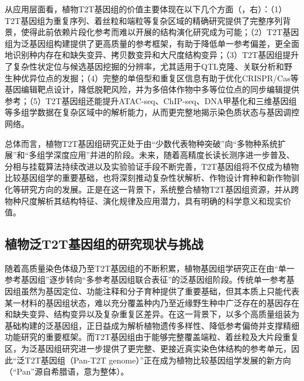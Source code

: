 从应用层面看，植物T2T基因组的价值主要体现在以下几个方面（，右）：（1）T2T基因组为重复序列、着丝粒和端粒等复杂区域的精确研究提供了完整序列背景，使得此前依赖片段化参考而难以开展的结构演化研究成为可能\cite{zhou2022centromeres}；（2）T2T基因组为泛基因组构建提供了更高质量的参考框架，有助于降低单一参考偏差，更全面地识别种内存在和缺失变异、拷贝数变异和大尺度结构变异\cite{schreiber2024plant}；（3）T2T基因组提升了复杂性状定位与候选基因挖掘的分辨率，尤其适用于QTL克隆、关联分析和野生种优异位点的发掘\cite{yu2022aegilops}；（4）完整的单倍型和重复区信息有助于优化CRISPR/Cas等基因编辑靶点设计，降低脱靶风险，并为多倍体作物中多等位位点的同步编辑提供参考\cite{gao2021genome}；（5）T2T基因组还能提升ATAC-seq、ChIP-seq、DNA甲基化和三维基因组等多组学数据在复杂区域中的解析能力，从而更完整地揭示染色质状态与基因调控网络\cite{lu2019prevalence, bennetzen2000many}。

总体而言，植物T2T基因组研究正处于由“少数代表物种突破”向“多物种系统扩展”和“多组学深度应用”并进的阶段。未来，随着高精度长读长测序进一步普及、分相与挂载算法持续改进以及实验验证手段不断完善，T2T基因组将不仅成为植物比较基因组学的重要基础，也将深刻推动复杂性状解析、作物设计育种和新作物驯化等研究方向的发展。正是在这一背景下，系统整合植物T2T基因组资源，并从跨物种尺度解析其结构特征、演化规律及应用潜力，具有明确的科学意义和现实价值。

\subsection{植物泛T2T基因组的研究现状与挑战}

随着高质量染色体级乃至T2T基因组的不断积累，植物基因组学研究正在由“单一参考基因组”逐步转向“多参考基因组联合表征”的泛基因组阶段。传统单一参考基因组虽然为基因定位、功能注释和分子育种提供了重要基础，但其本质上只能代表某一材料的基因组状态，难以充分覆盖种内乃至近缘野生种中广泛存在的基因存在和缺失变异、结构变异以及复杂重复区差异。在这一背景下，以多个高质量组装为基础构建的泛基因组，正日益成为解析植物遗传多样性、降低参考偏倚并支撑精细功能研究的重要框架\cite{schreiber2024plant}。而T2T基因组由于能够完整覆盖端粒、着丝粒及大片段重复区，为泛基因组研究进一步提供了更完整、更接近真实染色体结构的参考单元，因此“泛T2T基因组（Pan-T2T genome）”正在成为植物比较基因组学发展的新方向（“Pan”源自希腊语，意为整体）。

